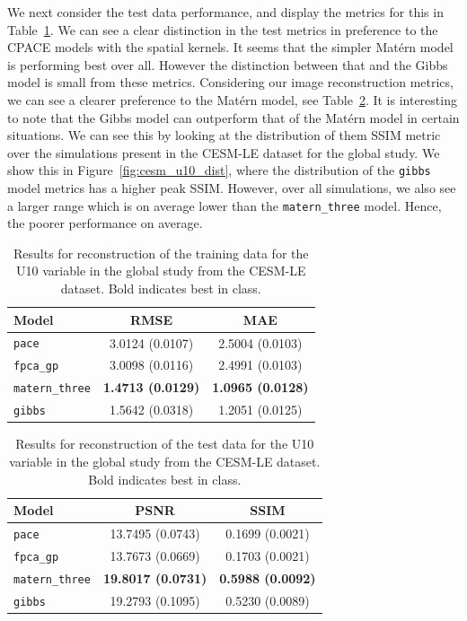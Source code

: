 We next consider the test data performance, and display the metrics for this in Table~\ref{tab:test_cesm_u10_globe}.
We can see a clear distinction in the test metrics in preference to the CPACE models with the spatial kernels.
It seems that the simpler Mat\'ern model is performing best over all.
However the distinction between that and the Gibbs model is small from these metrics.
Considering our image reconstruction metrics, we can see a clearer preference to the Mat\'ern model, see Table~\ref{tab:full_cesm_u10_globe}. 
It is interesting to note that the Gibbs model can outperform that of the Mat\'ern model in certain situations.
We can see this by looking at the distribution of them SSIM metric over the simulations present in the CESM-LE dataset for the global study.
We show this in Figure~\ref{fig:cesm_u10_dist}, where the distribution of the \verb*|gibbs| model metrics has a higher peak SSIM. 
However, over all simulations, we also see a larger range which is on average lower than the \verb*|matern_three| model. 
Hence, the poorer performance on average.


\begin{table}
	\caption[Results for U10 variable on test data in the Global study]{Results for reconstruction of the training data for the U10 variable in the global study from the CESM-LE dataset. Bold indicates best in class.}
	\centering
	\label{tab:test_cesm_u10_globe}
	\begin{tabular}{lcc}
		\toprule
		\textbf{Model} & \textbf{RMSE} & \textbf{MAE} \\
		\midrule
		\verb*|pace| & 3.0124 (0.0107) & 2.5004	(0.0103) \\
		\verb*|fpca_gp| & 3.0098 (0.0116) & 2.4991 (0.0103) \\
		\verb*|matern_three| & \textbf{1.4713 (0.0129)}& \textbf{1.0965	(0.0128)}\\
		\verb*|gibbs| & 1.5642	(0.0318) & 1.2051	(0.0125)\\
		\bottomrule
	\end{tabular}
\end{table}

\begin{table}
	\caption[Results for U10 variable on training data in the Global study]{Results for reconstruction of the test data for the U10 variable in the global study from the CESM-LE dataset. Bold indicates best in class.}
	\centering
	\label{tab:full_cesm_u10_globe}
	\begin{tabular}{lcc}
		\toprule
		\textbf{Model} & \textbf{PSNR} & \textbf{SSIM} \\
		\midrule
		\verb*|pace| & 13.7495	(0.0743) & 0.1699 (0.0021) \\
		\verb*|fpca_gp| & 13.7673 (0.0669)& 0.1703 (0.0021) \\
		\verb*|matern_three| & \textbf{19.8017 (0.0731)}& \textbf{0.5988 (0.0092)}\\
		\verb*|gibbs| & 19.2793	(0.1095) & 0.5230 (0.0089)\\
		\bottomrule
	\end{tabular}
\end{table}

